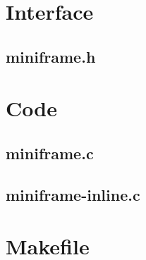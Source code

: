 \section{Interface}

\subsection{miniframe.h}

\begin{scriptsize}
\begin{ttfamily}

\end{ttfamily}
\end{scriptsize}

\section{Code}

\subsection{miniframe.c}

\begin{scriptsize}
\begin{ttfamily}

\end{ttfamily}
\end{scriptsize}

\subsection{miniframe-inline.c}

\begin{scriptsize}
\begin{ttfamily}

\end{ttfamily}
\end{scriptsize}

\section{Makefile}

\begin{scriptsize}
\begin{ttfamily}

\end{ttfamily}
\end{scriptsize}

